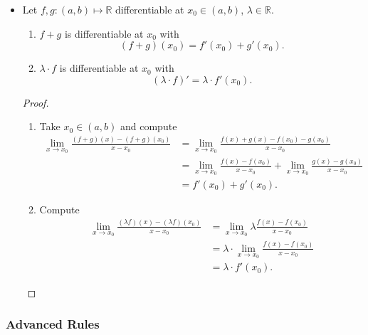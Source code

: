 \documentclass{article}
\newcommand{\R}{\mathbb{R}}
\newcommand{\?}{\stackrel{?}{=}}
\theoremstyle{definition} %
\begin{document}
\begin{itemize}
    \item[]
    \begin{proposition}
        Let $f, g: (a, b) \mapsto \R$ differentiable at $x_0 \in (a, b)$, $\lambda \in \R$.
        \begin{enumerate}[label=(\roman*)]
            \item $f + g$ is differentiable at $x_0$ with
            $$(f + g)(x_0) = f'(x_0) + g'(x_0).$$
            \item $\lambda \cdot f$ is differentiable at $x_0$ with
            $$(\lambda \cdot f)' = \lambda \cdot f'(x_0).$$
        \end{enumerate}
    \end{proposition}
    \begin{proof}
        \begin{enumerate}[label=(\roman*)]
            \item Take $x_0 \in (a, b)$ and compute
            \begin{align*}
                \lim_{x \to x_0} \frac{(f + g)(x) - (f + g)(x_0)}{x - x_0} &= \lim_{x \to x_0} \frac{f(x) + g(x) - f(x_0) - g(x_0)}{x - x_0} \\
                &= \lim_{x \to x_0} \frac{f(x) - f(x_0)}{x - x_0} + \lim_{x \to x_0} \frac{g(x) - g(x_0)}{x - x_0} \\
                &= f'(x_0) + g'(x_0).
            \end{align*}
            \item Compute
            \begin{align*}
                \lim_{x \to x_0} \frac{(\lambda f)(x) - (\lambda f)(x_0)}{x - x_0} &= \lim_{x \to x_0} \lambda \frac{f(x) - f(x_0)}{x - x_0} \\
                &= \lambda \cdot \lim_{x \to x_0} \frac{f(x) - f(x_0)}{x - x_0} \\
                &= \lambda \cdot f'(x_0).
            \end{align*}
        \end{enumerate}
    \end{proof}
\end{itemize}

\subsubsection{Advanced Rules}
\end{document}
